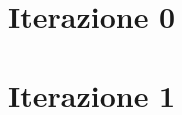 \documentclass[12pt,a4paper,openright,titlepage,twoside]{book}
\begin{document}
	
	\frontmatter	
	
%	
	\mainmatter				
	\tableofcontents	%
	\listoffigures		%
	\chapter{Iterazione 0}
	
	
	
	
	
	\chapter{Iterazione 1}
	
	
	\backmatter	
%	
	
\end{document}
